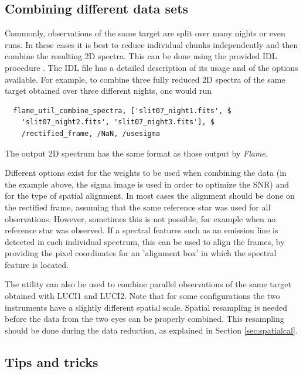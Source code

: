 \documentclass[a4paper]{article}
\newcommand{\flame}{\emph{Flame}}
\begin{document}
\begin{sloppypar}
\subsection{Combining different data sets}

Commonly, observations of the same target are split over many nights or even runs. In these cases it is best to reduce individual chunks independently and then combine the resulting 2D spectra. This can be done using the provided IDL procedure . The IDL file has a detailed description of its usage and of the options available. For example, to combine three fully reduced 2D spectra of the same target obtained over three different nights, one would run
\begin{lstlisting}
  flame_util_combine_spectra, ['slit07_night1.fits', $
    'slit07_night2.fits', 'slit07_night3.fits'], $
    /rectified_frame, /NaN, /usesigma
\end{lstlisting}
The output 2D spectrum has the same format as those output by \flame.

Different options exist for the weights to be used when combining the data (in the example above, the sigma image is used in order to optimize the SNR) and for the type of spatial alignment. In most cases the alignment should be done on the rectified frame, assuming that the same reference star was used for all observations. However, sometimes this is not possible, for example when no reference star was observed. If a spectral features such as an emission line is detected in each individual spectrum, this can be used to align the frames, by providing the pixel coordinates for an 'alignment box' in which the spectral feature is located.

The utility  can also be used to combine parallel observations of the same target obtained with LUCI1 and LUCI2. Note that for some configurations the two instruments have a slightly different spatial scale. Spatial resampling is needed before the data from the two eyes can be properly combined. This resampling should be done during the data reduction, as explained in Section \ref{sec:spatialcal}.


\subsection{Tips and tricks}
\label{sec:tips}


\end{sloppypar}
\end{document}
